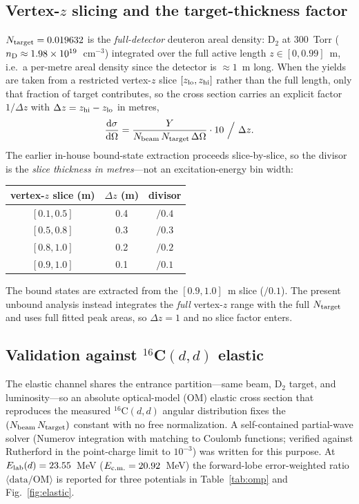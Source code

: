 \documentclass[11pt,a4paper]{article}
\newcommand{\Cs}{$^{16}$C}
\begin{document}
\subsection{Vertex-$z$ slicing and the target-thickness factor}
\label{sec:znorm}
$N_{\rm target}=0.019632$ is the \emph{full-detector} deuteron areal density:
D$_2$ at $300$~Torr ($n_{\rm D}\approx1.98\times10^{19}$~cm$^{-3}$) integrated
over the full active length $z\in[0,0.99]$~m, i.e.\ a per-metre areal density
since the detector is $\approx1$~m long. When the yields are taken from a
restricted vertex-$z$ slice $[z_{\rm lo},z_{\rm hi}]$ rather than the full
length, only that fraction of target contributes, so the cross section carries
an explicit factor $1/\Delta z$ with $\Delta z=z_{\rm hi}-z_{\rm lo}$ in metres,
\begin{equation}
  \frac{\mathrm{d}\sigma}{\mathrm{d}\Omega}
  = \frac{Y}{N_{\rm beam}\,N_{\rm target}\,\Delta\Omega}\cdot 10
    \ \Big/\ \Delta z .
  \label{eq:znorm}
\end{equation}
The earlier in-house bound-state extraction proceeds slice-by-slice, so the
divisor is the \emph{slice thickness in metres}---not an excitation-energy bin
width:
\begin{center}
  \begin{tabular}{ccc}
    \toprule
    vertex-$z$ slice (m) & $\Delta z$ (m) & divisor \\
    \midrule
    $[0.1,0.5]$ & 0.4 & $/0.4$ \\
    $[0.5,0.8]$ & 0.3 & $/0.3$ \\
    $[0.8,1.0]$ & 0.2 & $/0.2$ \\
    $[0.9,1.0]$ & 0.1 & $/0.1$ \\
    \bottomrule
  \end{tabular}
\end{center}
The bound states are extracted from the $[0.9,1.0]$~m slice ($/0.1$). The
present unbound analysis instead integrates the \emph{full} vertex-$z$ range
with the full $N_{\rm target}$ and uses full fitted peak areas, so $\Delta z=1$
and no slice factor enters.

\subsection{Validation against \Cs$(d,d)$ elastic}
The elastic channel shares the entrance partition---same beam, D$_2$ target,
and luminosity---so an absolute optical-model (OM) elastic cross section that
reproduces the measured \Cs$(d,d)$ angular distribution fixes the
$(N_{\rm beam}\,N_{\rm target})$ constant with no free normalization. A
self-contained partial-wave solver (Numerov integration with matching to
Coulomb functions; verified against Rutherford in the point-charge limit to
$10^{-3}$) was written for this purpose. At $E_{\rm lab}(d)=23.55$~MeV
($E_{\rm c.m.}=20.92$~MeV) the forward-lobe error-weighted ratio
$\langle\mathrm{data}/\mathrm{OM}\rangle$ is reported for three potentials in
Table~\ref{tab:omp} and Fig.~\ref{fig:elastic}.
\end{document}
